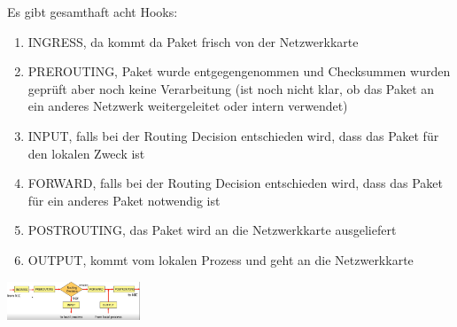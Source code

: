 \documentclass{report}
\newenvironment{Figure}
	{\par\medskip\noindent\minipage{\linewidth}}
	{\endminipage\par\medskip}
\theoremstyle{definition}
\theoremstyle{example}
\begin{document}
Es gibt gesamthaft acht Hooks:
\begin{enumerate}
	\item INGRESS, da kommt da Paket frisch von der Netzwerkkarte
	\item PREROUTING, Paket wurde entgegengenommen und Checksummen wurden geprüft aber noch keine Verarbeitung (ist noch nicht klar, ob das Paket an ein anderes Netzwerk weitergeleitet oder intern verwendet)
	\item INPUT, falls bei der Routing Decision entschieden wird, dass das Paket für den lokalen Zweck ist
	\item FORWARD, falls bei der Routing Decision entschieden wird, dass das Paket für ein anderes Paket notwendig ist
	\item POSTROUTING, das Paket wird an die Netzwerkkarte ausgeliefert
	\item OUTPUT, kommt vom lokalen Prozess und geht an die Netzwerkkarte
\end{enumerate}

\begin{Figure}
\centering
\includegraphics[width=150px]{img/netfilterHooks.png}
	\label{fig:Die 8 Hooks beim Netfilter}
\end{Figure}
\end{document}
